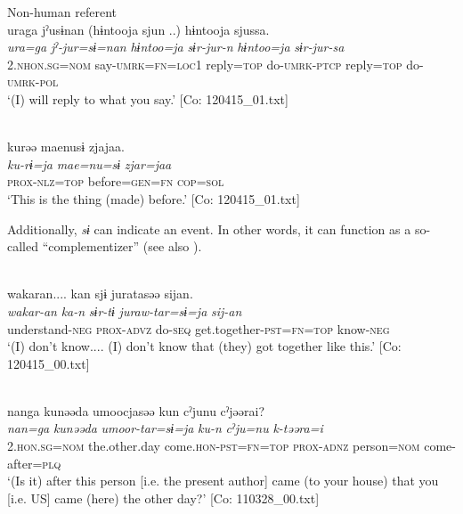 \ex
  Non-human referent\\
{\TM}
\glll uraga  jˀusɨnan  (hɨntooja  sjun ..)    hɨntooja  sjussa.\\
\textit{ura=ga}  \textit{jˀ-jur=sɨ=nan}  \textit{hɨntoo=ja}  \textit{sɨr-jur-n} \textit{hɨntoo=ja}  \textit{sɨr-jur-sa}\\
2.\textsc{nhon}.\textsc{sg}=\textsc{nom}  say-\textsc{umrk}=\textsc{fn}=\textsc{loc}1  reply=\textsc{top}  do-\textsc{umrk}-\textsc{ptcp}   reply=\textsc{top}  do-\textsc{umrk}-\textsc{pol}\\
\glt ‘(I) will reply to what you say.’ [Co: 120415\_01.txt]
\z

\ex{}\\
{\TM}
\glll  kurəə  {\textbar}mae{\textbar}nusɨ  zjajaa.\\
\textit{ku-rɨ=ja}  \textit{mae=nu=sɨ}  \textit{zjar=jaa}\\
\textsc{prox}-\textsc{nlz}=\textsc{top}  before=\textsc{gen}=\textsc{fn}  \textsc{cop}=\textsc{sol}\\
\glt ‘This is the thing (made) before.’ [Co: 120415\_01.txt]
\z

Additionally, \textit{sɨ} can indicate an event. In other words, it can function as a so-called “complementizer” (see also ).

\ea\label{ex:6-11}
\ea{}\\
{\TM}
\glll  wakaran....  kan  sjɨ  juratasəə sijan.\\
\textit{wakar-an}  \textit{ka-n}  \textit{sɨr-tɨ}  \textit{juraw-tar=sɨ=ja} \textit{sij-an}\\
understand-\textsc{neg}  \textsc{prox}-\textsc{advz}  do-\textsc{seq}  get.together-\textsc{pst}=\textsc{fn}=\textsc{top}     know-\textsc{neg}\\
\glt ‘(I) don’t know.... (I) don’t know that (they) got together like this.’ [Co: 120415\_00.txt]
\z

\ex{}\\
{\TM}
\glll  nanga  kunəəda  umoocjasəə  kun  cˀjunu  cˀjəərai?\\
\textit{nan=ga}  \textit{kunəəda}  \textit{umoor-tar=sɨ=ja}  \textit{ku-n}   \textit{cˀju=nu}  \textit{k-təəra=i}\\
2.\textsc{hon}.\textsc{sg}=\textsc{nom}  the.other.day  come.\textsc{hon}-\textsc{pst}=\textsc{fn}=\textsc{top}  \textsc{prox}-\textsc{adnz}   person=\textsc{nom}  come-after=\textsc{plq}\\
\glt ‘(Is it) after this person [i.e. the present author] came (to your house) that you [i.e. US] came (here) the other day?’ [Co: 110328\_00.txt]
\z

